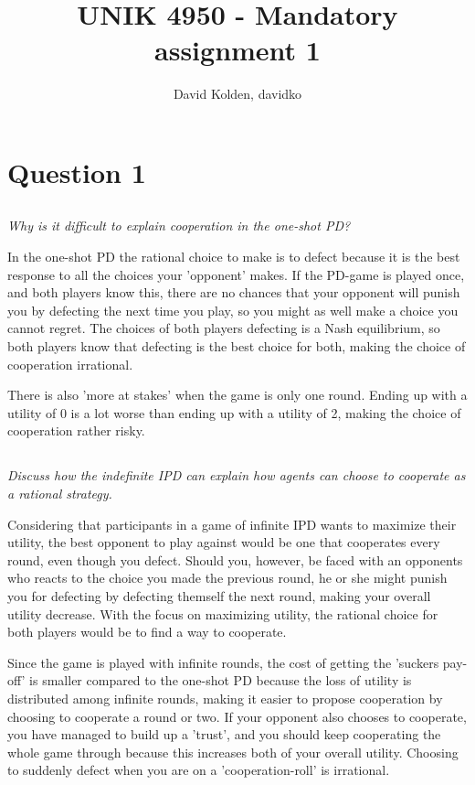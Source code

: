 \documentclass{article}
\author{David Kolden, davidko}
\title{UNIK 4950 - Mandatory assignment 1}
\begin{document}
\maketitle
\section{Question 1}
\subsection{ }
\textit{Why is it difficult to explain cooperation in the one-shot PD?}

In the one-shot PD the rational choice to make is to defect because it is the best response to all the choices your 'opponent' makes. If the PD-game is played once, and both players know this, there are no chances that your opponent will punish you by defecting the next time you play, so you might as well make a choice you cannot regret. The choices of both players defecting is a Nash equilibrium, so both players know that defecting is the best choice for both, making the choice of cooperation irrational.

There is also 'more at stakes' when the game is only one round. Ending up with a utility of 0 is a lot worse than ending up with a utility of 2, making the choice of cooperation rather risky.

\subsection{ }
\textit{Discuss how the indefinite IPD can explain how agents can choose to cooperate as a rational
strategy.}

Considering that participants in a game of infinite IPD wants to maximize their utility, the best opponent to play against would be one that cooperates every round, even though you defect. Should you, however, be faced with an opponents who reacts to the choice you made the previous round, he or she might punish you for defecting by defecting themself the next round, making your overall utility decrease. With the focus on maximizing utility, the rational choice for both players would be to find a way to cooperate.

Since the game is played with infinite rounds, the cost of getting the 'suckers pay-off' is smaller compared to the one-shot PD because the loss of utility is distributed among infinite rounds, making it easier to propose cooperation by choosing to cooperate a round or two. If your opponent also chooses to cooperate, you have managed to build up a 'trust', and you should keep cooperating the whole game through because this increases both of your overall utility. Choosing to suddenly defect when you are on a 'cooperation-roll' is irrational.
\end{document}

